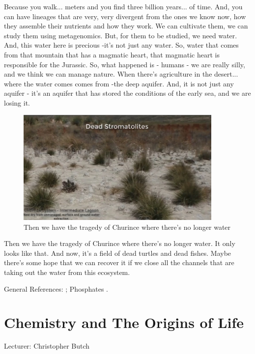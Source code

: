 \documentclass[]{article}
\begin{document}
Because you walk... meters and you find three billion years... of time. And, you can have lineages that are very, very divergent from the ones we know now, how they assemble their nutrients and how they work. We can cultivate them, we can study them using metagenomics. But, for them to be studied, we need water. And, this water here is precious -it's not just any water. So, water that comes from that mountain that has a magmatic heart, that magmatic heart is responsible for the Jurassic. So, what happened is - humans - we are really silly, and we think we can manage nature. When there's agriculture in the desert... where the water comes comes from -the deep aquifer. And, it is not just any aquifer - it's an aquifer that has stored the conditions of the early sea, and we are losing it.

\begin{figure}[H]
	\caption[The tragedy of Churince where there's no longer water]{Then we have the tragedy of Churince where there's no longer water} 
	\includegraphics[width=0.9\textwidth]{CuatroCienegas11}
\end{figure}

Then we have the tragedy of Churince where there's no longer water. It only looks like that. And now, it's a field of dead turtles and dead fishes. Maybe there's some hope that we can recover it if we close all the channels that are taking out the water from this ecosystem.

General References:  \cite{gomez2018leptolyngbya,taboada2018geographic}; Phosphates \cite{hao2020cycling,elser2006early}.

\section{Chemistry and The Origins of Life}

Lecturer: Christopher Butch
\end{document}
